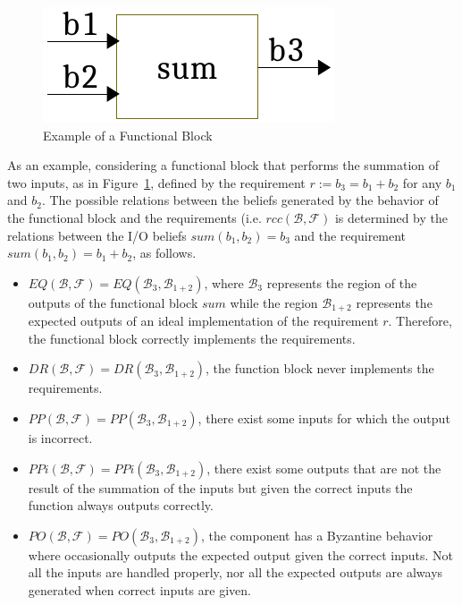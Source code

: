 \documentclass[conference]{IEEEtran}
\newcommand{\beliefRegion}{\mathcal{B}}
\newcommand{\factRegion}{\mathcal{F}}
\newcommand{\Rcc}[2]{rcc(#1,#2)}
\newcommand{\eq}[2]{EQ(#1,#2)}
\newcommand{\pp}[2]{PP(#1,#2)}
\newcommand{\po}[2]{PO(#1,#2)}
\newcommand{\ppi}[2]{PPi(#1,#2)}
\newcommand{\dr}[2]{DR(#1,#2)}
\begin{document}
\begin{figure}[t]
	\centering
	\includegraphics[width=0.3\columnwidth]{sum.pdf}
	\caption{Example of a Functional Block}
	\label{fig:sum}
\end{figure}

As an example, considering a functional block that performs the summation of two
inputs, as in Figure~\ref{fig:sum}, defined by the requirement $r := b_3 = b_1
+ b_2$ for any $b_1$ and $b_2$. The possible relations between the beliefs generated by the behavior of the functional block and
the requirements (i.e. $\Rcc{\beliefRegion}{\factRegion}$ is determined by
the relations between the I/O beliefs $sum(b_1,b_2)=b_3$ and the requirement
$sum(b_1,b_2)=b_1+b_2$, as follows.
\begin{itemize}
	\item $\eq{\beliefRegion}{\factRegion}=\eq{\beliefRegion_3}{\beliefRegion_{1+2}}$, 
		where $\beliefRegion_3$ represents the region of the
		outputs of the functional block $sum$ while the region
		$\beliefRegion_{1+2}$ represents the expected
		outputs of an ideal implementation of the requirement $r$.
		Therefore, the functional block correctly implements the
		requirements.
	\item
		$\dr{\beliefRegion}{\factRegion}=\dr{\beliefRegion_3}{\beliefRegion_{1+2}}$,
		the function block never implements the requirements.
	\item
		$\pp{\beliefRegion}{\factRegion}=\pp{\beliefRegion_3}{\beliefRegion_{1+2}}$, there exist some inputs for which
		the output is incorrect.
	\item $\ppi{\beliefRegion}{\factRegion}=\ppi{\beliefRegion_3}{\beliefRegion_{1+2}}$, there exist some outputs that are not the result of the summation of the inputs but given the correct inputs the function always outputs correctly.
	\item
		$\po{\beliefRegion}{\factRegion}=\po{\beliefRegion_3}{\beliefRegion_{1+2}}$,
		the component has a Byzantine behavior where occasionally
		outputs the expected output given the correct inputs. Not all
		the inputs are handled properly, nor all the expected outputs
		are always generated when correct inputs are given.
\end{itemize}
\end{document}
